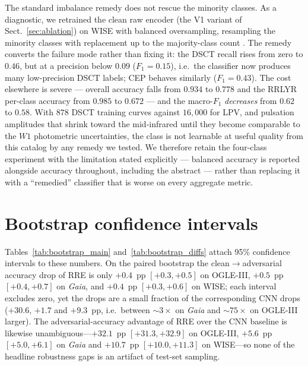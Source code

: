 \documentclass{aa}
\begin{document}
The standard imbalance remedy does not rescue the minority
classes. As a diagnostic, we retrained the clean raw encoder (the V1
variant of Sect.~\ref{sec:ablation}) on WISE with balanced oversampling,
resampling the minority classes with replacement up to the majority-class
count \citep[cf.][]{hosenie2020imbalance}. The remedy converts the failure
mode rather than fixing it: the DSCT recall rises from zero to $0.46$,
but at a precision below $0.09$ ($F_1 = 0.15$), i.e.\ the classifier now
produces many low-precision DSCT labels; CEP behaves similarly
($F_1 = 0.43$). The cost elsewhere is severe --- overall accuracy falls
from $0.934$ to $0.778$ and the RRLYR per-class accuracy from $0.985$ to
$0.672$ --- and the macro-$F_1$ \emph{decreases} from $0.62$ to $0.58$.
With $878$ DSCT training curves against $16{,}000$ for LPV, and pulsation
amplitudes that shrink toward the mid-infrared until they become
comparable to the $W1$ photometric uncertainties, the class is not
learnable at useful quality from this catalog by any remedy we tested. We
therefore retain the four-class experiment with the limitation stated
explicitly --- balanced accuracy is reported alongside accuracy
throughout, including the abstract --- rather than replacing it with a
``remedied'' classifier that is worse on every aggregate metric.



\section{Bootstrap confidence intervals}
\label{app:bootstrap}

Tables~\ref{tab:bootstrap_main} and~\ref{tab:bootstrap_diffs} attach 95\% confidence intervals to these numbers. On the paired bootstrap the clean$\to$adversarial accuracy drop of RRE is only $+0.4$~pp $[+0.3,+0.5]$ on OGLE-III, $+0.5$~pp $[+0.4,+0.7]$ on \textit{Gaia}, and $+0.4$~pp $[+0.3,+0.6]$ on WISE; each interval excludes zero, yet the drops are a small fraction of the corresponding CNN drops ($+30.6$, $+1.7$ and $+9.3$~pp, i.e.\ between ${\sim}3\times$ on \textit{Gaia} and ${\sim}75\times$ on OGLE-III larger). The adversarial-accuracy advantage of RRE over the CNN baseline is likewise unambiguous---$+32.1$~pp $[+31.3,+32.9]$ on OGLE-III, $+5.6$~pp $[+5.0,+6.1]$ on \textit{Gaia} and $+10.7$~pp $[+10.0,+11.3]$ on WISE---so none of the headline robustness gaps is an artifact of test-set sampling.
\end{document}
